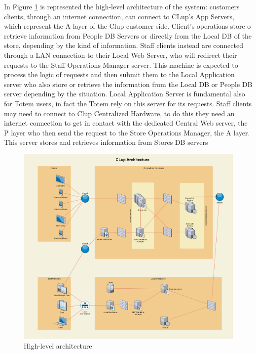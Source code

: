 In Figure \ref{fig:HLArch} is represented the high-level architecture of the system: customers clients, through an internet connection, can connect to CLup's App Servers, which represent the A layer of the Clup customer side. Client's operations store o retrieve information from People DB Servers or directly from the Local DB of the store, depending by the kind of information. Staff clients instead are connected through a LAN connection to their Local Web Server, who will redirect their requests to the Staff Operations Manager server. This machine is expected to process the logic of requests and then submit them to the Local Application server who also store or retrieve the information from the Local DB or People DB server depending by the situation. Local Application Server is fundamental also for Totem users, in fact the Totem rely on this server for its requests. Staff clients may need to connect to Clup Centralized Hardware, to do this they need an internet connection to get in contact with the dedicated Central Web server, the P layer who then send the request to the Store Operations Manager, the A layer. This server stores and retrieves information from Stores DB servers

\begin{figure}[h!]
	\includegraphics[width=\linewidth]{../Diagrams/Archtecture/Architecture_diagram.png}
	\caption{High-level architecture}
	\label{fig:HLArch}
\end{figure}
\newpage
